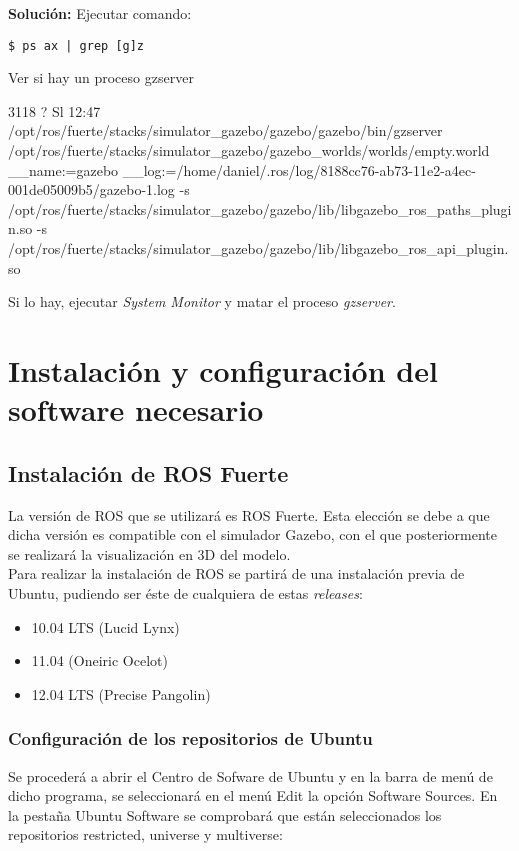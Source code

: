 \documentclass[10pt, a4paper]{report}
\begin{document}
\textbf{Solución: }
Ejecutar comando:
\begin{verbatim}
$ ps ax | grep [g]z
\end{verbatim}

Ver si hay un proceso gzserver

\begin{spverbatim}
 3118 ?        Sl    12:47
 /opt/ros/fuerte/stacks/simulator_gazebo/gazebo/gazebo/bin/gzserver 
 /opt/ros/fuerte/stacks/simulator_gazebo/gazebo_worlds/worlds/empty.world __name:=gazebo __log:=/home/daniel/.ros/log/8188cc76-ab73-11e2-a4ec-001de05009b5/gazebo-1.log -s /opt/ros/fuerte/stacks/simulator_gazebo/gazebo/lib/libgazebo_ros_paths_plugin.so -s /opt/ros/fuerte/stacks/simulator_gazebo/gazebo/lib/libgazebo_ros_api_plugin.so
\end{spverbatim}

Si lo hay, ejecutar \textit{System Monitor} y matar el proceso \textit{gzserver}.

\chapter{Instalación y configuración del software necesario}

\section{Instalación de ROS Fuerte}

La versión de ROS que se utilizará es ROS Fuerte. Esta elección se debe a que dicha versión es compatible con el simulador Gazebo, con el que posteriormente se realizará la visualización en 3D del modelo.\\

Para realizar la instalación de ROS  se partirá de una instalación previa de Ubuntu, pudiendo ser éste de cualquiera de estas \textit{releases}:

\begin{itemize}
\item 10.04 LTS (Lucid Lynx)
\item 11.04 (Oneiric Ocelot)
\item 12.04 LTS (Precise Pangolin)
\end{itemize}

\subsection{Configuración de los repositorios de Ubuntu}

Se procederá a abrir el Centro de Sofware de Ubuntu y en la barra de menú de dicho programa, se seleccionará en el menú Edit la opción Software Sources. En la pestaña Ubuntu Software se comprobará que están seleccionados los repositorios restricted, universe y multiverse:\\
\end{document}
